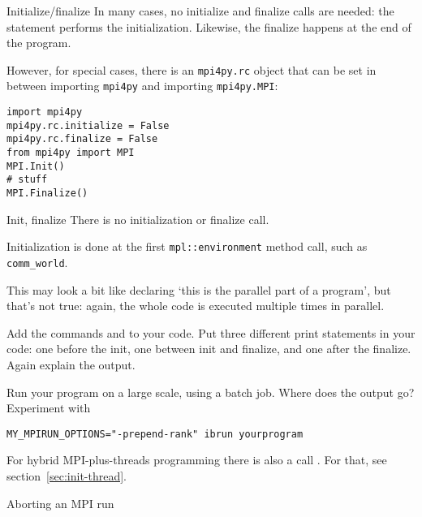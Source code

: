 \begin{pythonnote}{Initialize/finalize}
  In many cases,  no initialize and finalize calls are needed:
  the statement
  performs the initialization.
  Likewise, the finalize happens at the end of the program.

  However, for special cases, there is an \lstinline{mpi4py.rc} object
  that can be set in between importing \lstinline{mpi4py} and
  importing \lstinline{mpi4py.MPI}:
\begin{lstlisting}
import mpi4py
mpi4py.rc.initialize = False
mpi4py.rc.finalize = False
from mpi4py import MPI
MPI.Init()
# stuff
MPI.Finalize()
\end{lstlisting}
\end{pythonnote}

\begin{mplnote}{Init, finalize}
  There is no initialization or finalize call.
  \begin{mplimpl}
    Initialization is done at the first \lstinline+mpl::environment+ method call,
    such as \lstinline+comm_world+.
  \end{mplimpl}

\end{mplnote}

This may look a bit like declaring `this is the parallel part of a
program', but that's not true: again, the whole code is executed
multiple times in parallel.

\begin{exercise}
  \label{ex:hello2}
  Add the commands  and 
  to your code. Put three different print statements in your code: one before the init,
  one between init and finalize, and one after the finalize. Again explain the output.

  Run your program on a large scale, using a batch job.
  Where does the output go?
  Experiment with
\begin{verbatim}
MY_MPIRUN_OPTIONS="-prepend-rank" ibrun yourprogram
\end{verbatim}
\end{exercise}

\begin{remark}
  For hybrid MPI-plus-threads programming there is also a call
  . For that, see
  section~\ref{sec:init-thread}.
\end{remark}

 {Aborting an MPI run}

